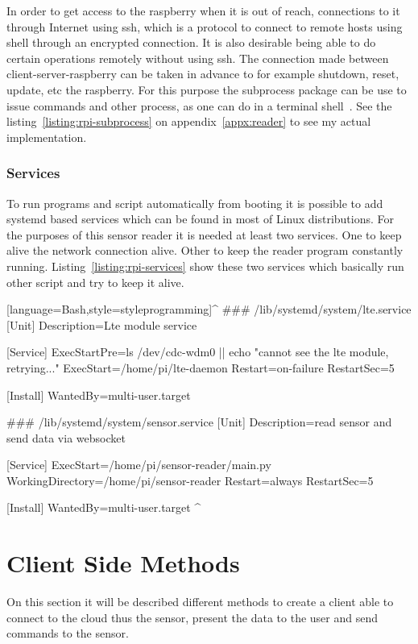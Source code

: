 \documentclass[hidelinks,11pt,a4paper,oneside,article]{memoir}
\begin{document}
In order to get access to the raspberry when it is out of reach, connections to it through Internet using \gls{ssh}, which is a protocol to connect to remote hosts using shell through an encrypted connection. It is also desirable being able to do certain operations remotely without using \gls{ssh}. The connection made between client-server-raspberry can be taken in advance to for example shutdown, reset, update, etc the raspberry. For this purpose the subprocess package can be use to issue commands and other process, as one can do in a terminal shell~\cite{python-subprocess}. See the listing~\ref{listing:rpi-subprocess} on appendix~\ref{appx:reader} to see my actual implementation.

\subsubsection{Services}
To run programs and script automatically from booting it is possible to add systemd based services which can be found in most of Linux distributions. For the purposes of this sensor reader it is needed at least two services. One to keep alive the network connection alive. Other to keep the reader program constantly running. Listing~\ref{listing:rpi-services} show these two services which basically run other script and try to keep it alive.

[language=Bash,style=styleprogramming]^
### /lib/systemd/system/lte.service
[Unit]
Description=Lte module service

[Service]
ExecStartPre=ls /dev/cdc-wdm0 || echo "cannot see the lte module, retrying..."
ExecStart=/home/pi/lte-daemon
Restart=on-failure
RestartSec=5

[Install]
WantedBy=multi-user.target

### /lib/systemd/system/sensor.service
[Unit]
Description=read sensor and send data via websocket

[Service]
ExecStart=/home/pi/sensor-reader/main.py
WorkingDirectory=/home/pi/sensor-reader
Restart=always
RestartSec=5

[Install]
WantedBy=multi-user.target
^

\section{Client Side Methods}\label{sec:client-application-methods}
On this section it will be described different methods to create a client able to connect to the cloud thus the sensor, present the data to the user and send commands to the sensor.
\end{document}
